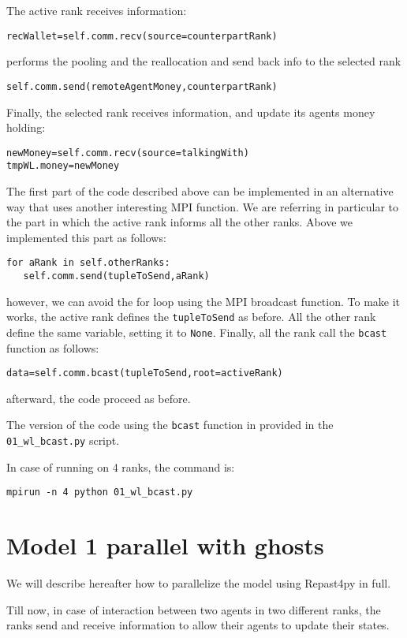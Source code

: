 \documentclass{article}
\begin{document}
The active rank receives information:
\begin{verbatim}
recWallet=self.comm.recv(source=counterpartRank)
\end{verbatim}
performs the pooling and the reallocation and send back info to the selected rank
\begin{verbatim}
self.comm.send(remoteAgentMoney,counterpartRank)
\end{verbatim}
Finally, the selected rank receives information, and update its agents money holding:
\begin{verbatim}
newMoney=self.comm.recv(source=talkingWith)
tmpWL.money=newMoney
\end{verbatim}

The first part of the code described above can be implemented in an alternative way that uses another interesting MPI function.
We are referring in particular to the part in which the active rank informs all the other ranks. Above we implemented this part as follows:
\begin{verbatim}
for aRank in self.otherRanks:
   self.comm.send(tupleToSend,aRank)
\end{verbatim}
however, we can avoid the for loop using the MPI broadcast function.
To make it works, the active rank defines the \verb+tupleToSend+ as before. All the other rank define the same variable, setting it to \verb+None+.
Finally, all the rank call the \verb+bcast+ function as follows:
\begin{verbatim}
data=self.comm.bcast(tupleToSend,root=activeRank)
\end{verbatim}
afterward, the code proceed as before.

The version of the code using the \verb+bcast+ function in provided in the \verb+01_wl_bcast.py+ script.

In case of running on 4 ranks, the command is:
\begin{verbatim}
mpirun -n 4 python 01_wl_bcast.py
\end{verbatim}

\section{Model 1 parallel with ghosts}

We will describe hereafter how to parallelize the model using Repast4py in full.

Till now, in case of interaction between two agents in two different ranks, the ranks send and receive information to allow their agents to update their states.
\end{document}
